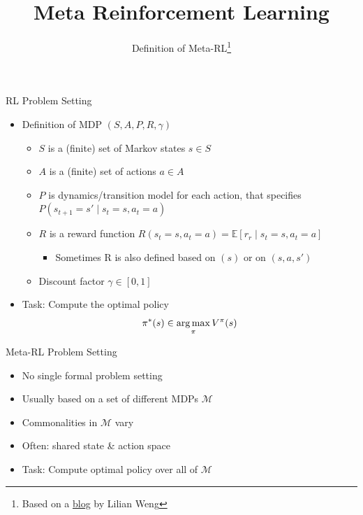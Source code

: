 \documentclass[aspectratio=169]{../latex_main/tntbeamer}  %
\title[Meta-RL]{Meta Reinforcement Learning}
\subtitle{Definition of Meta-RL\footnote{Based on a \href{https://lilianweng.github.io/lil-log/2019/06/23/meta-reinforcement-learning.html}{blog} by Lilian Weng}}
\begin{document}
	
	\maketitle

\begin{frame}[c]{RL Problem Setting}

\begin{itemize}
	\item Definition of MDP $(S,A,P, R, \gamma)$
	\begin{itemize}
		\item $S$ is a (finite) set of Markov states $s \in S$
		\item $A$ is a (finite) set of actions $a \in A$
		\item $P$ is dynamics/transition model for each action, that specifies $P(s_{t+1} = s' \mid s_t=s, a_t=a)$
		\item $R$ is a reward function 
		$R(s_t=s, a_t=a) = \mathbb{E}[r_r \mid s_t=s, a_t=a] $
		\begin{itemize}
			\item Sometimes R is also defined based on $(s)$ or on $(s,a,s')$
		\end{itemize}
		\item Discount factor $\gamma \in [0, 1]$
	\end{itemize}
	\bigskip
	\item Task: Compute the optimal policy
		$$ \pi^*(s)  \in \operatorname*{arg\,max}_\pi V^\pi(s)$$
\end{itemize}


\end{frame}
\begin{frame}[c]{Meta-RL Problem Setting}
	
\begin{itemize}
	\item No single formal problem setting
	\item Usually based on a set of different MDPs $\mathcal{M}$ 
	\item Commonalities in $\mathcal{M}$ vary
	\item Often: shared state \& action space
	\item Task: Compute optimal policy over all of $\mathcal{M}$
\end{itemize}
	
\end{frame}
\end{document}
